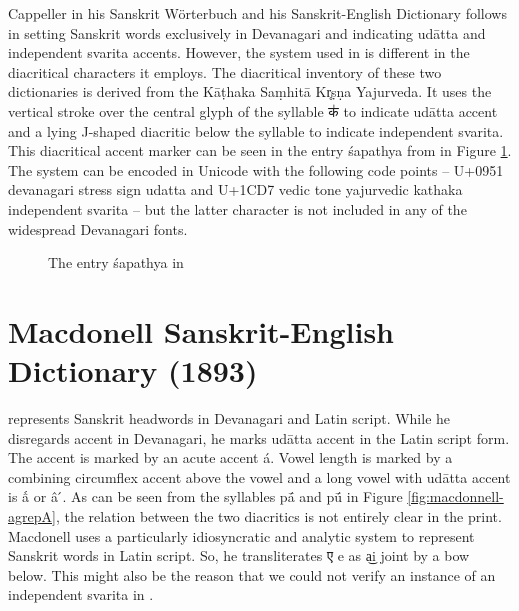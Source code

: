 Cappeller in his Sanskrit Wörterbuch \citep{ccs} and his Sanskrit-English Dictionary \citep{cae} follows \citet{pwg} in setting Sanskrit words exclusively in Devanagari and indicating udātta and independent svarita accents. However, the system used in \citet{ccs,cae} is different in the diacritical characters it employs. The diacritical inventory of these two dictionaries is derived from the Kāṭhaka Saṃhitā Kr̥ṣṇa Yajurveda. It uses the vertical stroke over the central glyph of the syllable {\devfont क॑} to indicate udātta accent and a lying J-shaped diacritic below the syllable to indicate independent svarita. This diacritical accent marker can be seen in the entry śapathya from \citet{cae} in Figure \ref{fig:Capeller-SapaTya}. The system can be encoded in Unicode with the following code points – U+0951 {\sc devanagari stress sign udatta} and U+1CD7 {\sc vedic tone yajurvedic kathaka independent svarita} – but the latter character is not included in any of the widespread Devanagari fonts. 

\begin{figure}[!ht]
\begin{center}
\end{center}
\caption[The entry śapathya in \citet{cae}]{\label{fig:Capeller-SapaTya}The entry śapathya in \citet{cae}}
\end{figure}

\section{Macdonell Sanskrit-English Dictionary (1893)}

\citet{md} represents Sanskrit headwords in Devanagari and Latin script. While he disregards accent in Devanagari, he marks udātta accent in the Latin script form. The accent is marked by an acute accent á. Vowel length is marked by a combining circumflex accent above the vowel and a long vowel with udātta accent is ấ or â ́. As can be seen from the syllables pā́ and pū́ in Figure \ref{fig:macdonnell-agrepA}, the relation between the two diacritics is not entirely clear in the print. Macdonell uses a particularly idiosyncratic and analytic system to represent Sanskrit words in Latin script. So, he transliterates {\devfont ए} e as a͜i joint by a bow below. This might also be the reason that we could not verify an instance of an independent svarita in \citet{md}.

